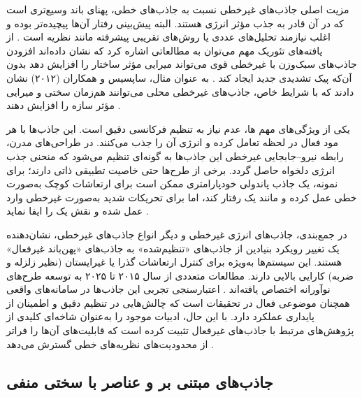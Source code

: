 مزیت اصلی جاذب‌های غیرخطی نسبت به جاذب‌های خطی، پهنای باند وسیع‌تری است که در آن قادر به جذب مؤثر انرژی هستند. البته پیش‌بینی رفتار آن‌ها پیچیده‌تر بوده و اغلب نیازمند تحلیل‌های عددی یا روش‌های تقریبی پیشرفته مانند نظریه  است \cite{habib2019impulsive, habib2021tracking}. از یافته‌های تئوریک مهم می‌توان به مطالعاتی اشاره کرد که نشان داده‌اند افزودن جاذب‌های سبک‌وزن با غیرخطی قوی می‌تواند میرایی مؤثر ساختار را افزایش دهد بدون آن‌که پیک تشدیدی جدید ایجاد کند \cite{georgiades2009passive, georgiades2007broadband}. به عنوان مثال، ساپسیس و همکاران (۲۰۱۲) نشان دادند که با شرایط خاص، جاذب‌های غیرخطی محلی می‌توانند هم‌زمان سختی و میرایی مؤثر سازه را افزایش دهند \cite{quinn2013effective}.

یکی از ویژگی‌های مهم ها، عدم نیاز به تنظیم فرکانسی دقیق است. این جاذب‌ها با هر مود فعال در لحظه تعامل کرده و انرژی آن را جذب می‌کنند. در طراحی‌های مدرن، رابطه نیرو–جابجایی غیرخطی این جاذب‌ها به گونه‌ای تنظیم می‌شود که منحنی جذب انرژی دلخواه حاصل گردد. برخی از طرح‌ها حتی خاصیت تطبیقی ذاتی دارند؛ برای نمونه، یک جاذب پاندولی خودپارامتری ممکن است برای ارتعاشات کوچک به‌صورت خطی عمل کرده و مانند یک  رفتار کند، اما برای تحریکات شدید به‌صورت غیرخطی وارد عمل شده و نقش یک  را ایفا نماید \cite{kecik2022nonlinear, vakakis2022nonlinear, raze2020multimodal}.

در جمع‌بندی، جاذب‌های انرژی غیرخطی و دیگر انواع جاذب‌های  غیرخطی، نشان‌دهنده یک تغییر رویکرد بنیادین از جاذب‌های «تنظیم‌شده» به جاذب‌های «پهن‌باند غیرفعال» هستند. این سیستم‌ها به‌ویژه برای کنترل ارتعاشات گذرا یا غیرایستان (نظیر زلزله و ضربه) کارایی بالایی دارند. مطالعات متعددی از سال ۲۰۱۵ تا ۲۰۲۵ به توسعه طرح‌های نوآورانه  اختصاص یافته‌اند \cite{gzal2024enhanced, yang2022research, guo2025vibration, treacy2024irrational, lizunov2024comparison, al2021comparison}. اعتبارسنجی تجربی این جاذب‌ها در سامانه‌های واقعی همچنان موضوعی فعال در تحقیقات است که چالش‌هایی در تنظیم دقیق و اطمینان از پایداری عملکرد دارد. با این حال، ادبیات موجود  را به‌عنوان شاخه‌ای کلیدی از پژوهش‌های مرتبط با جاذب‌های غیرفعال تثبیت کرده است که قابلیت‌های آن‌ها را فراتر از محدودیت‌های نظریه‌های خطی گسترش می‌دهد \cite{wu2022improved, lu2024hybrid, geng2024state, parseh2015performance, zheng2023h, qiu2018theoretical, wu2022estimation}.


\subsection{جاذب‌های مبتنی بر  و عناصر با سختی منفی}

